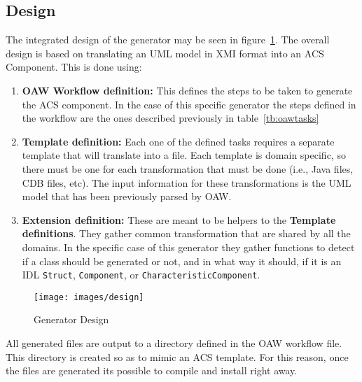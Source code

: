 \subsection{Design}
\label{sec:design}
The integrated design of the generator may be seen in figure~\ref{fg:design}.
The overall design is based on translating an UML model in XMI format
into an ACS Component.
This is done using:
\begin{enumerate}
    \item\textbf{OAW Workflow definition:}
    This defines the steps to be taken to generate the ACS component.
    In the case of this specific generator
    the steps defined in the workflow are the ones
    described previously in table~\ref{tb:oawtasks}
    \item\textbf{Template definition:}
    Each one of the defined tasks requires a separate template that will
    translate into a file. Each template is domain specific, so there must be one for each transformation
    that must be done (i.e., Java files, CDB files, etc).
    The input information for these transformations
    is the UML model that has been previously parsed by OAW.
    \item\textbf{Extension definition:} These are meant to be helpers to the \textbf{Template definitions}.
    They gather common transformation that are shared by all the domains. In the specific case
    of this generator they gather functions to detect if a class should be generated or not,
    and in what way it should, if it is an IDL
    \lstinline[language=IDL]!Struct!,
    \lstinline[language=IDL]!Component!,
    or \lstinline[language=IDL]!CharacteristicComponent!.
\end{enumerate}

\begin{figure}
  \begin{center}
  \texttt{[image: images/design]}
  \end{center}
  \caption{Generator Design}
  \label{fg:design}
\end{figure}

All generated files are output to a directory defined in the OAW workflow file.
This directory is created so as to mimic an ACS template.
For this reason,
once the files are generated its possible to compile and install right away.

